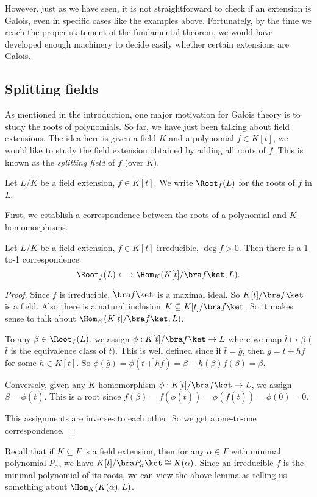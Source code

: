 \documentclass[a4paper]{article}
\begin{document}
However, just as we have seen, it is not straightforward to check if an extension is Galois, even in specific cases like the examples above. Fortunately, by the time we reach the proper statement of the fundamental theorem, we would have developed enough machinery to decide easily whether certain extensions are Galois.

\subsection{Splitting fields}
As mentioned in the introduction, one major motivation for Galois theory is to study the roots of polynomials. So far, we have just been talking about field extensions. The idea here is given a field $K$ and a polynomial $f \in K[t]$, we would like to study the field extension obtained by adding all roots of $f$. This is known as the \emph{splitting field} of $f$ (over $K$).

\begin{notation}
  Let $L/K$ be a field extension, $f\in K[t]$. We write $\Root_f(L)$ for the roots of $f$ in $L$.
\end{notation}

First, we establish a correspondence between the roots of a polynomial and $K$-homomorphisms.

\begin{lemma}
  Let $L/K$ be a field extension, $f\in K[t]$ irreducible, $\deg f > 0$. Then there is a 1-to-1 correspondence
  \[
    \Root_f(L)\longleftrightarrow \Hom_K(K[t]/\bra f\ket, L).
  \]
\end{lemma}

\begin{proof}
  Since $f$ is irreducible, $\bra f\ket$ is a maximal ideal. So $K[t] / \bra f\ket$ is a field. Also there is a natural inclusion $K\subseteq K[t] / \bra f\ket$. So it makes sense to talk about $\Hom_K(K[t]/\bra f\ket, L)$.

  To any $\beta\in \Root_f(L)$, we assign $\phi: K[t]/\bra f\ket \to L$ where we map $\bar t \mapsto \beta$ ($\bar t$ is the equivalence class of $t$). This is well defined since if $\bar{t} = \bar{g}$, then $g = t + hf$ for some $h \in K[t]$. So $\phi(\bar{g}) = \phi(\overline{t + hf}) = \beta + h(\beta) f(\beta) = \beta$.

  Conversely, given any $K$-homomorphism $\phi: K[t]/\bra f\ket \to L$, we assign $\beta = \phi(\bar t)$. This is a root since $f(\beta) = f(\phi(\bar t)) = \phi(f(\bar t)) = \phi(0) = 0$.

  This assignments are inverses to each other. So we get a one-to-one correspondence.
\end{proof}
Recall that if $K\subseteq F$ is a field extension, then for any $\alpha\in F$ with minimal polynomial $P_\alpha$, we have $K[t]/\bra P_\alpha\ket \cong K(\alpha)$. Since an irreducible $f$ is the minimal polynomial of its roots, we can view the above lemma as telling us something about $\Hom_K(K(\alpha), L)$.
\end{document}
